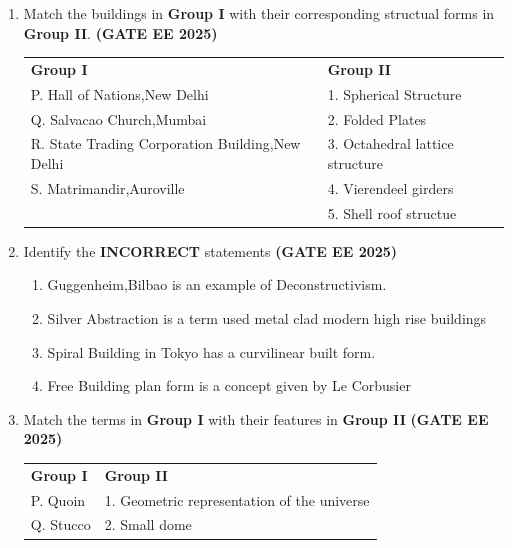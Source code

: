 \documentclass[journal,12pt,onecolumn]{IEEEtran}
\theoremstyle{remark}
\begin{document}
{\begin{enumerate}
\item Match the buildings in \textbf{Group I} with their corresponding structual forms in \textbf{Group II}. \hfill \textbf{(GATE EE 2025)}
\\
\begin{tabular}{p{}p{}}
\textbf{Group I}     & \textbf{Group II}  \\
P. Hall of Nations,New Delhi     & 1. Spherical Structure\\
Q. Salvacao Church,Mumbai  & 2. Folded Plates\\
R. State Trading Corporation Building,New Delhi & 3. Octahedral lattice structure\\
S. Matrimandir,Auroville & 4. Vierendeel girders\\
   & 5. Shell roof structue\\
\end{tabular}
\begin{enumerate}
\end{enumerate}
\item Identify the \textbf{INCORRECT} statements \hfill \textbf{(GATE EE 2025)}
\begin{enumerate} 
    \item Guggenheim,Bilbao is an example of Deconstructivism.
    \item Silver Abstraction is a term used metal clad modern high rise buildings
    \item Spiral Building in Tokyo has a curvilinear built form.
    \item Free Building plan form is a concept given by Le Corbusier
\end{enumerate}
\item Match the terms in \textbf{Group I} with their features in \textbf{Group II} \hfill \textbf{(GATE EE 2025)}
\\
\begin{tabular}{p{}p{}}
\textbf{Group I}     & \textbf{Group II}  \\
 P. Quoin   & 1. Geometric representation of the universe\\
 Q. Stucco  & 2. Small dome\\

\end{tabular}
\end{enumerate}}
\end{document}
